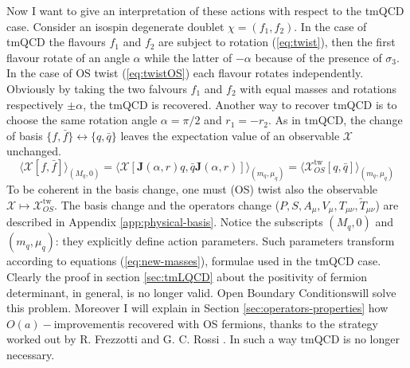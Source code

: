 \documentclass[english, LaM, oneside, noexaminfo]{sapthesis}
\newcommand{\la}{\langle}
\newcommand{\ra}{\rangle}
\newcommand{\oait}{$O(a)-$improvement}
\newcommand{\obc}{Open Boundary Conditions}
\begin{document}
Now I want to give an interpretation of these actions with respect to the tmQCD case.
Consider an isospin degenerate doublet $\chi = (f_1, f_2)$.
In the case of tmQCD the flavours $f_1$ and $f_2$ are subject to rotation (\ref{eq:twist}), then the first flavour rotate of an angle $\alpha$ while the latter of $-\alpha$ because of the presence of $\sigma_3$.
In the case of OS twist (\ref{eq:twistOS}) each flavour rotates independently.
Obviously by taking the two falvours $f_1$ and $f_2$ with equal masses and rotations respectively $\pm \alpha$, the tmQCD is recovered.
Another way to recover tmQCD is to choose the same rotation angle $\alpha = \pi/2$ and $r_1 = - r_2$.
\newline
As in tmQCD, the change of basis $\{f,\bar f\} \leftrightarrow \{q,\bar q\}$ leaves the expectation value of an observable $\mathcal{X}$ unchanged.
\begin{equation*}
    \la \mathcal{X}[f,\bar f]\ra_{(M_q,0)} = \la \mathcal{X}[\mathbf{J}(\alpha, r) q,\bar q\mathbf{J}(\alpha, r)]\ra_{(m_q,\mu_q)} = \la \mathcal{X}^\text{tw}_{OS}[q,\bar q]\ra_{(m_q,\mu_q)}
\end{equation*}
To be coherent in the basis change, one must (OS) twist also the observable $\mathcal{X} \mapsto \mathcal{X}^\text{tw}_{OS}$.
The basis change and the operators change ($P,S,A_\mu,V_\mu,T_{\mu\nu},\tilde{T}_{\mu\nu}$) are described in Appendix \ref{app:physical-basis}.
Notice the subscripts $(M_q,0)$ and $(m_q,\mu_q)$: they explicitly define action parameters.
Such parameters transform according to equations (\ref{eq:new-masses}), formulae used in the tmQCD case.
\newline
Clearly the proof in section \ref{sec:tmLQCD} about the positivity of fermion determinant, in general, is no longer valid.
\obc\space will solve this problem.
Moreover I will explain in Section \ref{sec:operators-properties} how \oait\space is recovered with OS fermions, thanks to the strategy worked out by R. Frezzotti and G. C. Rossi \cite{FR2}.
In such a way tmQCD is no longer necessary.
\end{document}
